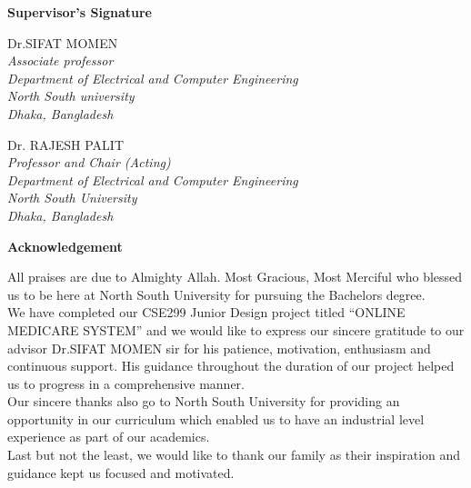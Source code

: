 \documentclass[14pt,a4paper,calibribody]{article}
\begin{document}
\begin{center}
\large{\textbf{Supervisor's Signature}}
\end{center}
\begin{center}
\vspace{0.8in}
\end{center}
\begin{center}
{Dr.SIFAT MOMEN}\\
{\emph{Associate professor\\
Department of Electrical and Computer Engineering\\
North South university\\
Dhaka, Bangladesh}}\\ 
\end{center}
\begin{center}
\vspace{1in}
\end{center}
\begin{center}
Dr. RAJESH PALIT\\
\emph{Professor and Chair (Acting)\\
Department of Electrical and Computer Engineering\\
North South University\\
Dhaka, Bangladesh}
\end{center}
\clearpage
\begin{center}
\large{\textbf{Acknowledgement}}
\end{center}
\vspace{0.25in}
All praises are due to Almighty Allah. Most Gracious, Most Merciful who blessed us to be here at North South University for pursuing the Bachelors degree.\\

We have completed our CSE299 Junior Design project titled “ONLINE MEDICARE SYSTEM” and we would like to express our sincere gratitude to our advisor Dr.SIFAT MOMEN sir for his patience, motivation, enthusiasm and continuous support. His guidance throughout the duration of our project helped us to progress in a comprehensive manner.\\

Our sincere thanks also go to North South University for providing an opportunity in our curriculum which enabled us to have an industrial level experience as part of our academics.\\

Last but not the least, we would like to thank our family as their inspiration and guidance kept us focused and motivated.
\clearpage
\end{document}
